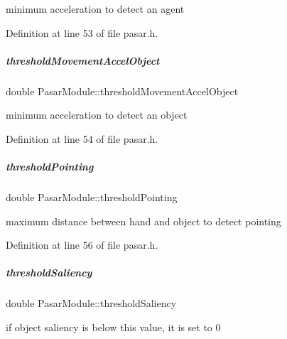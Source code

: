 minimum acceleration to detect an agent 



Definition at line 53 of file pasar.\+h.

\mbox{\label{group__pasar_aaee66528c2e631dda1539ac530092229}} 
\subparagraph{\texorpdfstring{threshold\+Movement\+Accel\+Object}{thresholdMovementAccelObject}}
{\footnotesize\ttfamily double Pasar\+Module\+::threshold\+Movement\+Accel\+Object\hspace{0.3cm}{\ttfamily [protected]}}



minimum acceleration to detect an object 



Definition at line 54 of file pasar.\+h.

\mbox{\label{group__pasar_a291feefbe67ed3e29994c73c4e185948}} 
\subparagraph{\texorpdfstring{threshold\+Pointing}{thresholdPointing}}
{\footnotesize\ttfamily double Pasar\+Module\+::threshold\+Pointing\hspace{0.3cm}{\ttfamily [protected]}}



maximum distance between hand and object to detect pointing 



Definition at line 56 of file pasar.\+h.

\mbox{\label{group__pasar_af0ed238a5d456b0ca04f75b3b2576f14}} 
\subparagraph{\texorpdfstring{threshold\+Saliency}{thresholdSaliency}}
{\footnotesize\ttfamily double Pasar\+Module\+::threshold\+Saliency\hspace{0.3cm}{\ttfamily [protected]}}



if object saliency is below this value, it is set to 0 



